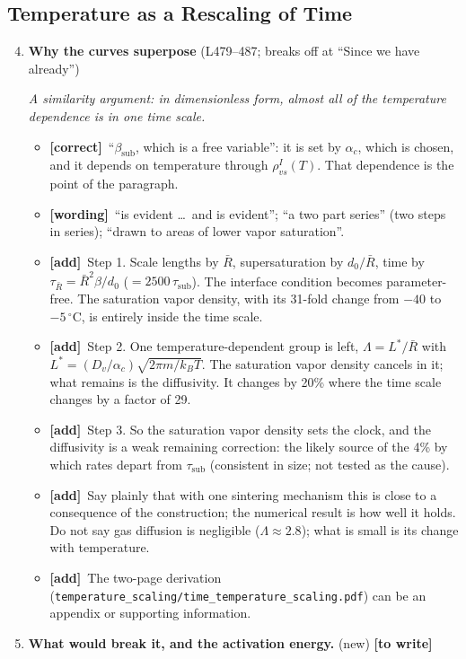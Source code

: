 \documentclass[11pt]{article}
\newcommand{\Miss}{\textcolor{miss}{\textbf{[to write]}}\ }
\newcommand{\Pg}[3]{\item \textbf{#1} {\small(#2)}\par\textit{#3}}
\newcommand{\tC}{\textcolor{miss}{\textbf{[correct]}}\ }
\newcommand{\tG}{\textcolor{stale}{\textbf{[wording]}}\ }
\newcommand{\tA}{\textcolor{have}{\textbf{[add]}}\ }
\newcommand{\New}[1]{\textbf{#1} \textnormal{\small(new)}}
\begin{document}
\subsection{Temperature as a Rescaling of Time}
\begin{enumerate}
\setcounter{enumi}{3}
\Pg{Why the curves superpose}{L479--487; breaks off at ``Since we have already''}{A similarity argument: in dimensionless form, almost all of the temperature dependence is in one time scale.}
  \begin{itemize}
  \item \tC ``$\beta_{\mathrm{sub}}$, which is a free variable'': it is set
    by $\alpha_c$, which is chosen, and it depends on temperature through
    $\rho_{vs}^{I}(T)$. That dependence is the point of the paragraph.
  \item \tG ``is evident \ldots\ and is evident''; ``a two part series''
    (two steps in series); ``drawn to areas of lower vapor saturation''.
  \item \tA Step 1. Scale lengths by $\bar R$, supersaturation by
    $d_0/\bar R$, time by $\tau_{\bar R} = \bar R^{2}\beta/d_0$
    ($= 2500\,\tau_{\mathrm{sub}}$). The interface condition becomes
    parameter-free. The saturation vapor density, with its 31-fold change
    from $-40$ to $-5\,^{\circ}$C, is entirely inside the time scale.
  \item \tA Step 2. One temperature-dependent group is left, $\Lambda =
    L^{*}/\bar R$ with $L^{*} = (D_v/\alpha_c)\sqrt{2\pi m/k_BT}$. The
    saturation vapor density cancels in it; what remains is the
    diffusivity. It changes by 20\% where the time scale changes by a
    factor of 29.
  \item \tA Step 3. So the saturation vapor density sets the clock, and the
    diffusivity is a weak remaining correction: the likely source of the
    4\% by which rates depart from $\tau_{\mathrm{sub}}$ (consistent in
    size; not tested as the cause).
  \item \tA Say plainly that with one sintering mechanism this is close to a
    consequence of the construction; the numerical result is how well it
    holds. Do not say gas diffusion is negligible ($\Lambda \approx 2.8$);
    what is small is its change with temperature.
  \item \tA The two-page derivation
    (\texttt{temperature\_scaling/\allowbreak time\_temperature\_scaling.pdf}) can be
    an appendix or supporting information.
  \end{itemize}
\item \New{What would break it, and the activation energy.} \Miss

\end{enumerate}
\end{document}
